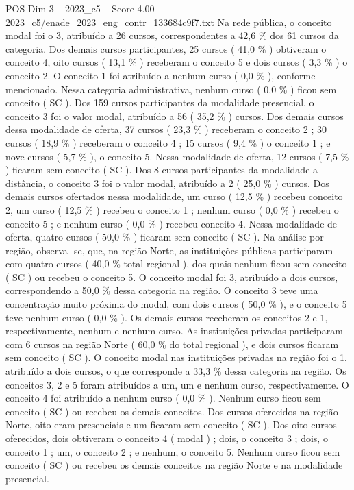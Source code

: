 \begin{textsample}{POS Dim 3 – 2023\_c5 – Score 4.00 – 2023\_c5/enade\_2023\_eng\_contr\_133684c9f7.txt}
Na rede pública, o conceito modal foi o 3, atribuído a 26 cursos, correspondentes a 42,6 \% dos 61 cursos da categoria.
Dos demais cursos participantes, 25 cursos ( 41,0 \% ) obtiveram o conceito 4, oito cursos ( 13,1 \% ) receberam o conceito 5 e dois cursos ( 3,3 \% ) o conceito 2.
O conceito 1 foi atribuído a nenhum curso ( 0,0 \% ), conforme mencionado.
Nessa categoria administrativa, nenhum curso ( 0,0 \% ) ficou sem conceito ( SC ).
Dos 159 cursos participantes da modalidade presencial, o conceito 3 foi o valor modal, atribuído a 56 ( 35,2 \% ) cursos.
Dos demais cursos dessa modalidade de oferta, 37 cursos ( 23,3 \% ) receberam o conceito 2 ; 30 cursos ( 18,9 \% ) receberam o conceito 4 ; 15 cursos ( 9,4 \% ) o conceito 1 ; e nove cursos ( 5,7 \% ), o conceito 5.
Nessa modalidade de oferta, 12 cursos ( 7,5 \% ) ficaram sem conceito ( SC ).
Dos 8 cursos participantes da modalidade a distância, o conceito 3 foi o valor modal, atribuído a 2 ( 25,0 \% ) cursos.
Dos demais cursos ofertados nessa modalidade, um curso ( 12,5 \% ) recebeu conceito 2, um curso ( 12,5 \% ) recebeu o conceito 1 ; nenhum curso ( 0,0 \% ) recebeu o conceito 5 ; e nenhum curso ( 0,0 \% ) recebeu conceito 4.
Nessa modalidade de oferta, quatro cursos ( 50,0 \% ) ficaram sem conceito ( SC ).
Na análise por região, observa -se, que, na região Norte, as instituições públicas participaram com quatro cursos ( 40,0 \% total regional ), dos quais nenhum ficou sem conceito ( SC ) ou recebeu o conceito 5.
O conceito modal foi 3, atribuído a dois cursos, correspondendo a 50,0 \% dessa categoria na região.
O conceito 3 teve uma concentração muito próxima do modal, com dois cursos ( 50,0 \% ), e o conceito 5 teve nenhum curso ( 0,0 \% ).
Os demais cursos receberam os conceitos 2 e 1, respectivamente, nenhum e nenhum curso.
As instituições privadas participaram com 6 cursos na região Norte ( 60,0 \% do total regional ), e dois cursos ficaram sem conceito ( SC ).
O conceito modal nas instituições privadas na região foi o 1, atribuído a dois cursos, o que corresponde a 33,3 \% dessa categoria na região.
Os conceitos 3, 2 e 5 foram atribuídos a um, um e nenhum curso, respectivamente.
O conceito 4 foi atribuído a nenhum curso ( 0,0 \% ).
Nenhum curso ficou sem conceito ( SC ) ou recebeu os demais conceitos.
Dos cursos oferecidos na região Norte, oito eram presenciais e um ficaram sem conceito ( SC ).
Dos oito cursos oferecidos, dois obtiveram o conceito 4 ( modal ) ; dois, o conceito 3 ; dois, o conceito 1 ; um, o conceito 2 ; e nenhum, o conceito 5.
Nenhum curso ficou sem conceito ( SC ) ou recebeu os demais conceitos na região Norte e na modalidade presencial.

\end{textsample}
